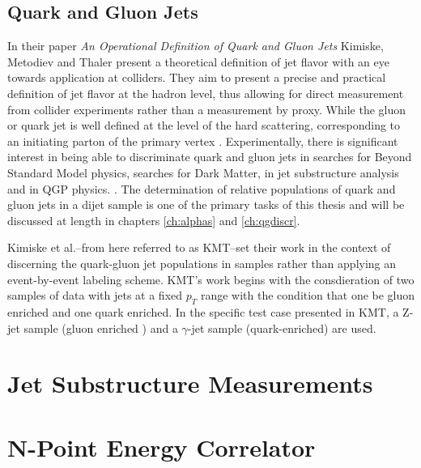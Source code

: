 \subsection{Quark and Gluon Jets}	
	In their paper \textit{An Operational Definition of Quark and Gluon Jets} \cite{Komiske2018} Kimiske, Metodiev and Thaler present a theoretical definition of jet flavor with an eye towards application at colliders. 
	They aim to present a precise and practical definition of jet flavor at the hadron level, thus allowing for direct measurement from collider experiments rather than a measurement by proxy. 
	While the gluon or quark jet is well defined at the level of the hard scattering, corresponding to an initiating parton of the primary vertex \cite{Jones1989} \cite{Fodor1990}. 
	Experimentally, there is significant interest in being able to discriminate quark and gluon jets in searches for Beyond Standard Model physics, searches for Dark Matter, in jet substructure analysis and in QGP physics. \cite{Gallicchio2011}\cite{Lima2017}\cite{Bhattacherjee2017}\cite{}. 
	The determination of relative populations of quark and gluon jets in a dijet sample is one of the primary tasks of this thesis and will be discussed at length in chapters \ref{ch:alphas} and \ref{ch:qgdiscr}. 

	Kimiske et al.--from here referred to as KMT--set their work in the context of discerning the quark-gluon jet populations in samples rather than applying an event-by-event labeling scheme. 
	KMT's work begins with the consdieration of two samples of data with jets at a fixed $p_{T}$ range with the condition that one be gluon enriched and one quark enriched. 
	In the specific test case presented in KMT, a Z-jet sample (gluon enriched ) and a $\gamma$-jet sample (quark-enriched) are used. %



\section{Jet Substructure Measurements}

\section{N-Point Energy Correlator}
%
